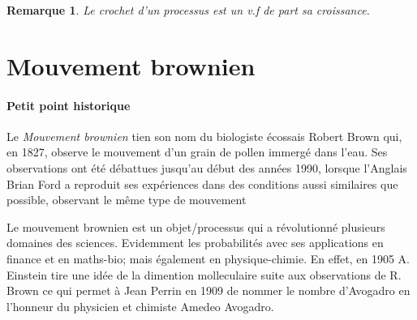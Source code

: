 \documentclass[openany]{book}
\newcommand{\F}{\mathscr{F}}
\newcommand{\E}{\mathbb{E}}
\newcommand{\1}{\mathbbm{1}}
\theoremstyle{thmfont}
\theoremstyle{deffont}
\newtheorem{definition}[definition]{Définition}
\theoremstyle{thmfont}
\theoremstyle{deffont}
\newtheorem*{remark}{Remarque}
\begin{document}
\begin{remark}
  Le crochet d'un processus est un v.f de part sa croissance.
\end{remark}

%
%
%
%

\section{Mouvement brownien}
\paragraph{Petit point historique}
Le \textit{Mouvement brownien} tien son nom du biologiste écossais Robert Brown qui, en 1827, observe le mouvement d'un grain de pollen immergé dans l'eau. Ses observations ont été débattues jusqu’au début des années 1990, lorsque l’Anglais Brian Ford a reproduit ses expériences dans des conditions aussi similaires que possible, observant le même type de mouvement


Le mouvement brownien est un objet/processus qui a révolutionné plusieurs domaines des sciences. Evidemment les probabilités avec ses applications en finance et en maths-bio; mais également en physique-chimie. En effet, en 1905 A. Einstein tire une idée de la dimention molleculaire suite aux observations de R. Brown ce qui permet à Jean Perrin en 1909 de nommer le nombre d'Avogadro en l'honneur du physicien et chimiste Amedeo Avogadro.
\end{document}
